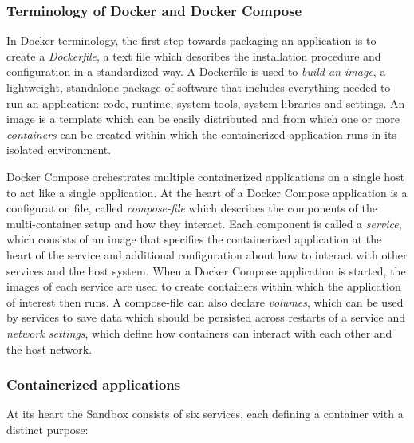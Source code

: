 \documentclass[11pt, a4paper, oneside, parskip=full-]{scrartcl}
\begin{document}
\subsubsection*{Terminology of Docker and Docker Compose}
In Docker terminology, the first step towards packaging an application is to
create a \emph{Dockerfile}, a text file which describes the installation
procedure and configuration in a standardized way. A Dockerfile is used to
\emph{build an image}, a lightweight, standalone package of software that
includes everything needed to run an application: code, runtime, system tools,
system libraries and settings\cite{dockerimage}. An image is a template which
can be easily distributed and from which one or more \emph{containers} can be
created within which the containerized application runs in its isolated
environment.

Docker Compose orchestrates multiple containerized applications on a single host
to act like a single application. At the heart of a Docker Compose application
is a configuration file, called \emph{compose-file} which describes the
components of the multi-container setup and how they interact. Each component is
called a \emph{service}, which consists of an image that specifies the
containerized application at the heart of the service and additional
configuration about how to interact with other services and the host system.
When a Docker Compose application is started, the images of each service are
used to create containers within which the application of interest then runs. A
compose-file can also declare \emph{volumes}, which can be used by services to
save data which should be persisted across restarts of a service and
\emph{network settings}, which define how containers can interact with each
other and the host network.

\subsubsection*{Containerized applications}
At its heart the Sandbox consists of six services, each defining a container
with a distinct purpose:
\end{document}
